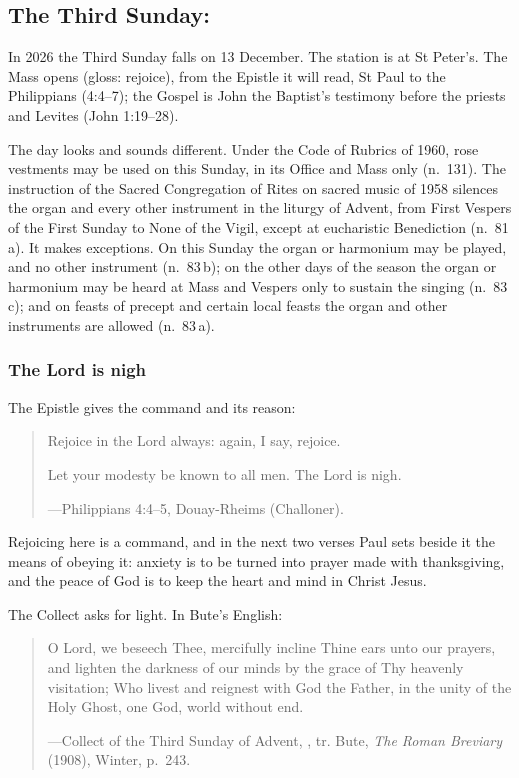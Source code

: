 \subsection{The Third Sunday: }\label{sec:third-sunday}

In 2026 the Third Sunday falls on 13 December. The station is at St Peter's. The Mass opens  (gloss: rejoice),
from the Epistle it will read, St Paul to the Philippians (4:4--7); the Gospel is John the
Baptist's testimony before the priests and Levites (John 1:19--28).

The day looks and sounds different. Under the Code of Rubrics of 1960, rose vestments may be
used on this Sunday, in its Office and Mass only (n.~131). The instruction of the Sacred
Congregation of Rites on sacred music of 1958 silences the organ and every other instrument in
the liturgy of Advent, from First Vespers of the First Sunday to None of the Vigil, except at
eucharistic Benediction (n.~81\,a). It makes exceptions. On this Sunday the organ or harmonium
may be played, and no other instrument (n.~83\,b); on the other days of the season the organ or
harmonium may be heard at Mass and Vespers only to sustain the singing (n.~83\,c); and on feasts
of precept and certain local feasts the organ and other instruments are allowed (n.~83\,a).

\subsubsection{The Lord is nigh}

The Epistle gives the command and its reason:

\begin{quote}
Rejoice in the Lord always: again, I say, rejoice.

Let your modesty be known to all men. The Lord is nigh.\par
{\smallskip\noindent\small ---Philippians 4:4--5, Douay-Rheims (Challoner).\par}
\end{quote}

\noindent Rejoicing here is a command, and in the next two verses Paul sets beside it the means of
obeying it: anxiety is to be turned into prayer made with thanksgiving, and the peace of God is
to keep the heart and mind in Christ Jesus.

The Collect asks for light. In Bute's English:

\begin{quote}
O Lord, we beseech Thee, mercifully incline Thine ears unto our prayers, and lighten the darkness
of our minds by the grace of Thy heavenly visitation; Who livest and reignest with God the Father,
in the unity of the Holy Ghost, one God, world without end.\par
{\smallskip\noindent\small ---Collect of the Third Sunday of Advent, , tr.
Bute, \textit{The Roman Breviary} (1908), Winter, p.~243.\par}
\end{quote}

